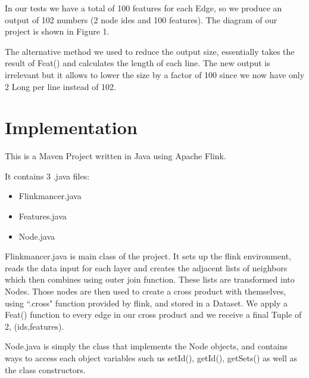In our tests we have a total of 100 features for each Edge, so we produce an output of 102 numbers (2 node ides and 100 features). The diagram of our project is shown in Figure 1.

The alternative method we used to reduce the output size, essentially takes the result of Feat() and calculates the length of each line. The new output is irrelevant but it allows to lower the size by a factor of 100 since we now have only 2 Long per line instead of 102.



\section{Implementation}

This is a Maven Project written in Java using Apache Flink. 

It contains 3 .java files:
\begin{itemize} 
\item Flinkmancer.java
\item Features.java
\item Node.java
\end{itemize}

Flinkmancer.java is main class of the project. It sets up the flink environment, reads the data input for each layer and creates the adjacent lists of neighbors which then combines using outer join function. These lists are transformed into Nodes. Those nodes are then used to create a cross product with themselves, using ``.cross" function provided by flink, and stored in a Dataset. We apply a Feat() function to every edge in our cross product and we receive a final Tuple of 2, (ids,features). \newline

Node.java is simply the class that implements the Node objects, and contains ways to access each object variables such us setId(), getId(), getSets() as well as the class constructors. \newline

